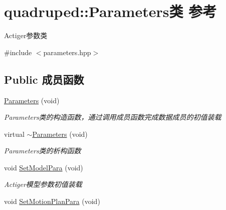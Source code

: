\hypertarget{classquadruped_1_1Parameters}{}\section{quadruped\+:\+:Parameters类 参考}
\label{classquadruped_1_1Parameters}


Actiger参数类  




{\ttfamily \#include $<$parameters.\+hpp$>$}

\subsection*{Public 成员函数}
\begin{DoxyCompactItemize}
\item 
\mbox{\label{classquadruped_1_1Parameters_a2b91ce175a39f2053fd34a690d30e43d}} 
\hyperlink{classquadruped_1_1Parameters_a2b91ce175a39f2053fd34a690d30e43d}{Parameters} (void)
\begin{DoxyCompactList}\small\item\em Parameters类的构造函数，通过调用成员函数完成数据成员的初值装载 \end{DoxyCompactList}\item 
\mbox{\label{classquadruped_1_1Parameters_a828df79e00f1a7ab14ab2ac8261c4753}} 
virtual \hyperlink{classquadruped_1_1Parameters_a828df79e00f1a7ab14ab2ac8261c4753}{$\sim$\+Parameters} (void)
\begin{DoxyCompactList}\small\item\em Parameters类的析构函数 \end{DoxyCompactList}\item 
\mbox{\label{classquadruped_1_1Parameters_a2e21af1a7a2f9e1f6f5de66b2f31c3bd}} 
void \hyperlink{classquadruped_1_1Parameters_a2e21af1a7a2f9e1f6f5de66b2f31c3bd}{Set\+Model\+Para} (void)
\begin{DoxyCompactList}\small\item\em Actiger模型参数初值装载 \end{DoxyCompactList}\item 
\mbox{\label{classquadruped_1_1Parameters_a591aefede84a9599cc6d053a3a4bd762}} 
void \hyperlink{classquadruped_1_1Parameters_a591aefede84a9599cc6d053a3a4bd762}{Set\+Motion\+Plan\+Para} (void)

\end{DoxyCompactItemize}
